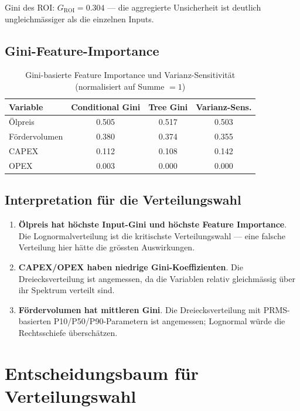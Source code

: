 \documentclass[12pt,a4paper]{article}
\begin{document}
Gini des ROI: $G_{\text{ROI}} = 0.304$ --- die aggregierte Unsicherheit ist deutlich ungleichmässiger als die einzelnen Inputs.

\subsection{Gini-Feature-Importance}

\begin{table}[h]
\centering
\begin{tabular}{lccc}
\toprule
\textbf{Variable} & \textbf{Conditional Gini} & \textbf{Tree Gini} & \textbf{Varianz-Sens.} \\
\midrule
Ölpreis & 0.505 & 0.517 & 0.503 \\
Fördervolumen & 0.380 & 0.374 & 0.355 \\
CAPEX & 0.112 & 0.108 & 0.142 \\
OPEX & 0.003 & 0.000 & 0.000 \\
\bottomrule
\end{tabular}
\caption{Gini-basierte Feature Importance und Varianz-Sensitivität (normalisiert auf Summe $= 1$)}
\end{table}

\subsection{Interpretation für die Verteilungswahl}

\begin{enumerate}
\item \textbf{Ölpreis hat höchste Input-Gini und höchste Feature Importance}. Die Lognormalverteilung ist die kritischste Verteilungswahl --- eine falsche Verteilung hier hätte die grössten Auswirkungen.
\item \textbf{CAPEX/OPEX haben niedrige Gini-Koeffizienten}. Die Dreiecksverteilung ist angemessen, da die Variablen relativ gleichmässig über ihr Spektrum verteilt sind.
\item \textbf{Fördervolumen hat mittleren Gini}. Die Dreiecksverteilung mit PRMS-basierten P10/P50/P90-Parametern ist angemessen; Lognormal würde die Rechtsschiefe überschätzen.
\end{enumerate}

\section{Entscheidungsbaum für Verteilungswahl}
\end{document}

